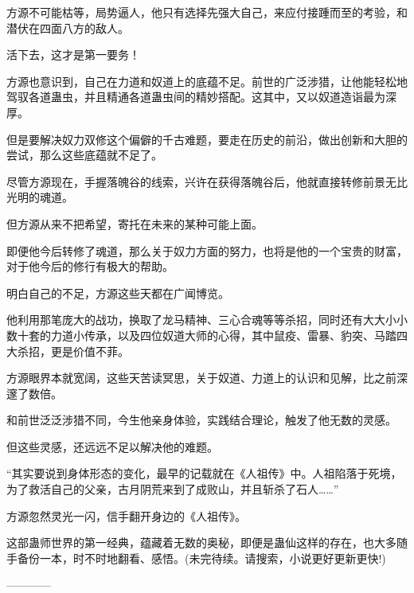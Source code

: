 \begin{this_body}
方源不可能枯等，局势逼人，他只有选择先强大自己，来应付接踵而至的考验，和潜伏在四面八方的敌人。

活下去，这才是第一要务！

方源也意识到，自己在力道和奴道上的底蕴不足。前世的广泛涉猎，让他能轻松地驾驭各道蛊虫，并且精通各道蛊虫间的精妙搭配。这其中，又以奴道造诣最为深厚。

但是要解决奴力双修这个偏僻的千古难题，要走在历史的前沿，做出创新和大胆的尝试，那么这些底蕴就不足了。

尽管方源现在，手握落魄谷的线索，兴许在获得落魄谷后，他就直接转修前景无比光明的魂道。

但方源从来不把希望，寄托在未来的某种可能上面。

即便他今后转修了魂道，那么关于奴力方面的努力，也将是他的一个宝贵的财富，对于他今后的修行有极大的帮助。

明白自己的不足，方源这些天都在广闻博览。

他利用那笔庞大的战功，换取了龙马精神、三心合魂等等杀招，同时还有大大小小数十套的力道小传承，以及四位奴道大师的心得，其中鼠疫、雷暴、豹突、马踏四大杀招，更是价值不菲。

方源眼界本就宽阔，这些天苦读冥思，关于奴道、力道上的认识和见解，比之前深邃了数倍。

和前世泛泛涉猎不同，今生他亲身体验，实践结合理论，触发了他无数的灵感。

但这些灵感，还远远不足以解决他的难题。

“其实要说到身体形态的变化，最早的记载就在《人祖传》中。人祖陷落于死境，为了救活自己的父亲，古月阴荒来到了成败山，并且斩杀了石人……”

方源忽然灵光一闪，信手翻开身边的《人祖传》。

这部蛊师世界的第一经典，蕴藏着无数的奥秘，即便是蛊仙这样的存在，也大多随手备份一本，时不时地翻看、感悟。(未完待续。请搜索，小说更好更新更快!)

------------

\end{this_body}

